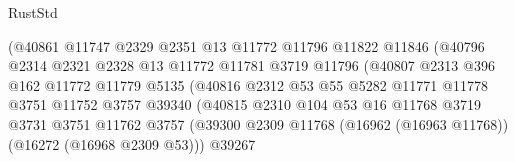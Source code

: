\begin{lexlean}{RustStd}
\begin{coremodule}
                                    (@40861
                                      @11747
                                      @2329
                                      @2351
                                      @13
                                      @11772
                                      @11796
                                      @11822
                                      @11846
                                      (@40796
                                        @2314
                                        @2321
                                        @2328
                                        @13
                                        @11772
                                        @11781
                                        @3719
                                        @11796
                                        (@40807
                                          @2313
                                          @396
                                          @162
                                          @11772
                                          @11779
                                          @5135
                                          (@40816
                                            @2312
                                            @53
                                            @55
                                            @5282
                                            @11771
                                            @11778
                                            @3751
                                            @11752
                                            @3757
                                            @39340
                                            (@40815
                                              @2310
                                              @104
                                              @53
                                              @16
                                              @11768
                                              @3719
                                              @3731
                                              @3751
                                              @11762
                                              @3757
                                              (@39300
                                                @2309
                                                @11768
                                                (@16962 (@16963 @11768))
                                                (@16272 (@16968 @2309 @53)))
                                              @39267

\end{coremodule}
\end{lexlean}
